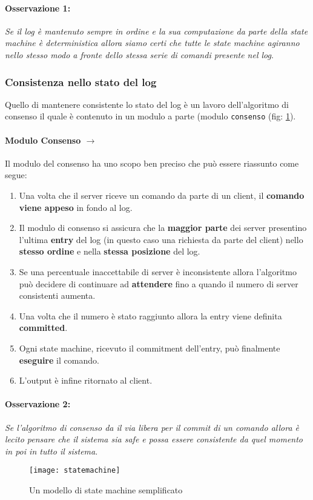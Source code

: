 			\paragraph{Osservazione 1:} \emph{Se il log è mantenuto sempre in ordine e la sua computazione da parte della state machine è deterministica allora siamo certi che tutte le state machine agiranno nello stesso modo a fronte dello stessa serie di comandi presente nel log}.

		\subsubsection{Consistenza nello stato del log}
			Quello di mantenere consistente lo stato del log è un lavoro dell'algoritmo di consenso il quale è contenuto in un modulo a parte (modulo \texttt{consenso} (fig: \ref{fig:figure1}).
			\paragraph{Modulo Consenso $\rightarrow$}
			Il modulo del consenso ha uno scopo ben preciso che può essere riassunto come segue:\begin{enumerate}
				\item Una volta che il server riceve un comando da parte di un client, il \textbf{comando viene appeso} in fondo al log. 
				\item Il modulo di consenso si assicura che la \textbf{maggior parte} dei server presentino l'ultima \textbf{entry} del log (in questo caso una richiesta da parte del client) nello \textbf{stesso ordine} e nella \textbf{stessa posizione} del log. 
				\item Se una percentuale inaccettabile di server è inconsistente allora l'algoritmo può decidere di continuare ad \textbf{attendere} fino a quando il numero di server consistenti aumenta.
				\item Una volta che il numero è stato raggiunto allora la entry viene definita \textbf{committed}.
				\item Ogni state machine, ricevuto il commitment dell'entry, può finalmente \textbf{eseguire} il comando.
				\item L'output è infine ritornato al client.
			\end{enumerate}
			\paragraph{Osservazione 2:} \emph{Se l'algoritmo di consenso da il via libera per il commit di un comando allora è lecito pensare che il sistema sia safe e possa essere consistente da quel momento in poi in tutto il sistema}.
	\begin{figure}[H]
		\centering
		\texttt{[image: statemachine]}
		\caption{Un modello di state machine semplificato}
		\label{fig:figure1}
	\end{figure}

